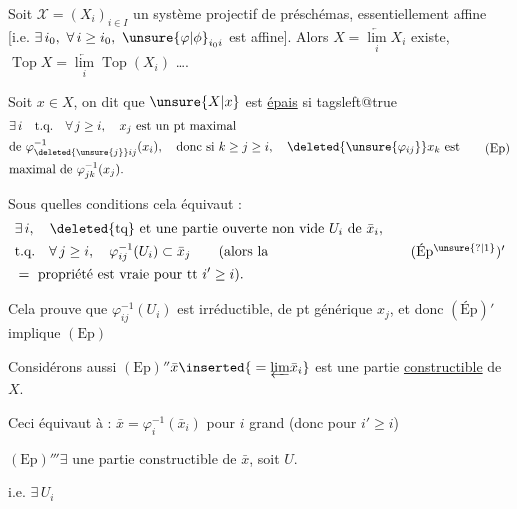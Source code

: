 Soit $\mathscr X=(X_i)_{i\in I}$ un système projectif de préschémas, essentiellement affine [i.e. $\exists\,i_0,\ \forall\,i\geq i_0,\ \unsure{\varphi|\phi}_{i_0i}$ est affine]. Alors $X=\underset{i}{\underleftarrow{\lim}} X_i$ existe, $\operatorname{Top} X=\underset{i}{\underleftarrow{\lim}}\operatorname{Top}(X_i)$ \ldots.

Soit $x\in X$, on dit que $\unsure{X|x}$ est \uline{épais} si
\begingroup\csname tagsleft@true\endcsname
\[
\begin{aligned}
&\exists\,i\quad\text{t.q.}\quad\forall\,j\geq i,\quad x_j\text{ est un pt maximal}\\
&\text{de }\varphi_{\deleted{\unsure{j}}ij}^{-1}(x_i),\quad\text{donc si }k\geq j\geq i,\quad\deleted{\unsure{\varphi_{ij}}}x_k\text{ est}\\
&\text{maximal de }\varphi_{jk}^{-1}(x_j).
\end{aligned}\tag*{(Ep)}
\]

Sous quelles conditions cela équivaut :
\[
\begin{aligned}
&\exists\,i,\quad\deleted{\text{tq}}\ \text{et une partie ouverte non vide }U_i\text{ de }\bar x_i,\\
&\text{t.q.}\quad\forall\,j\geq i,\quad\varphi_{ij}^{-1}(U_i)\subset\bar x_j\qquad\text{(alors la}\\
&{}=\text{ propriété est vraie pour tt }i'\geq i\text{).}
\end{aligned}\tag*{(Ép\textsuperscript{\unsure{?|1}})$'$}
\]

\endgroup
Cela prouve que $\varphi_{ij}^{-1}(U_i)$ est irréductible, de pt générique $x_j$, et donc $(\mathrm{Ép})'$ implique $(\mathrm{Ep})$

Considérons aussi
$(\mathrm{Ep})''$\quad $\bar x\inserted{{}=\underleftarrow{\lim}\bar x_i}$ est une partie \uline{constructible} de $X$.

Ceci équivaut  à : $\bar x=\varphi_i^{-1}(\bar x_i)$ pour $i$ grand  (donc pour $i'\geq i$)

$(\mathrm{Ep})'''$\quad $\exists$ une partie constructible  de $\bar x$, soit $U$.

i.e. $\exists\,U_i$
